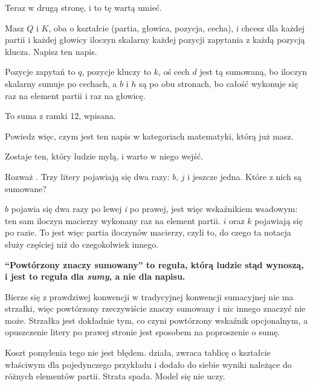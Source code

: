 \begin{fr}
Teraz w drugą stronę, i to tę wartą umieć.

Masz $Q$ i $K$, oba o kształcie (partia, głowica, pozycja, cecha), i chcesz dla
każdej partii i każdej głowicy iloczyn skalarny każdej pozycji zapytania z
każdą pozycją klucza. Napisz ten napis.
\dotline
\nextframe
\end{fr}

\begin{fr}
Pozycje zapytań to $q$, pozycje kluczy to $k$, oś cech $d$ jest tą sumowaną, bo
iloczyn skalarny sumuje po cechach, a $b$ i $h$ są po obu stronach, bo całość
wykonuje się raz na element partii i raz na głowicę.

To suma z ramki 12, wpisana.

Powiedz więc, czym jest ten napis w kategoriach matematyki, którą już masz.
\dotline
\nextframe
\end{fr}

\begin{fr}
Zostaje ten, który ludzie mylą, i warto w niego wejść.

Rozważ . Trzy litery pojawiają się dwa razy: $b$, $j$ i
jeszcze jedna. Które z nich są sumowane?
\dotline
\nextframe
\end{fr}

\begin{fr}
$b$ pojawia się dwa razy po lewej \emph{i} po prawej, jest więc wskaźnikiem
wsadowym: ten sam iloczyn macierzy wykonany raz na element partii. $i$ oraz $k$
pojawiają się po razie. To jest więc partia iloczynów macierzy, czyli to, do
czego ta notacja służy częściej niż do czegokolwiek innego.

\begin{trapbox}
\textbf{\enquote{Powtórzony znaczy sumowany} to reguła, którą ludzie stąd
wynoszą, i jest to reguła dla \emph{sumy}, a nie dla napisu.}

Bierze się z prawdziwej konwencji \dash{} w tradycyjnej konwencji sumacyjnej
nie ma strzałki, więc powtórzony rzeczywiście znaczy sumowany i nic innego
znaczyć nie może. Strzałka jest dokładnie tym, co czyni powtórzony wskaźnik
opcjonalnym, a opuszczenie litery po prawej stronie jest sposobem na
poproszenie o sumę.

Koszt pomylenia tego nie jest błędem.  działa, zwraca
tablicę o kształcie właściwym dla pojedynczego przykładu i dodało do siebie
wyniki należące do różnych elementów partii. Strata spada. Model się nie uczy.
\end{trapbox}
\end{fr}

